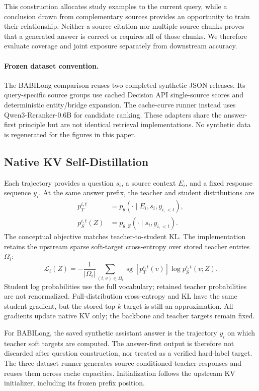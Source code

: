 This construction allocates study examples to the current query, while a conclusion drawn from complementary sources provides an opportunity to train their relationship. Neither a source citation nor multiple source chunks proves that a generated answer is correct or requires all of those chunks. We therefore evaluate coverage and joint exposure separately from downstream accuracy.

\paragraph{Frozen dataset convention.}
The BABILong comparison reuses two completed synthetic JSON releases. Its query-specific source groups use cached Decision API single-source scores and deterministic entity/bridge expansion. The cache-curve runner instead uses Qwen3-Reranker-0.6B for candidate ranking. These adapters share the answer-first principle but are not identical retrieval implementations. No synthetic data is regenerated for the figures in this paper.

\subsection{Native KV Self-Distillation}

Each trajectory provides a question $s_i$, a source context $E_i$, and a fixed response sequence $y_i$. At the same answer prefix, the teacher and student distributions are
\begin{align}
p_T^{i,t}&=p_\theta(\cdot\mid E_i,s_i,y_{i,<t}),\\
p_S^{i,t}(Z)&=p_{\theta,Z}(\cdot\mid s_i,y_{i,<t}).
\end{align}
The conceptual objective matches teacher-to-student KL. The implementation retains the upstream sparse soft-target cross-entropy over stored teacher entries $\Omega_i$:
\begin{equation}
\mathcal L_i(Z)=-\frac{1}{|\Omega_i|}\sum_{(t,v)\in\Omega_i}
\operatorname{sg}[p_T^{i,t}(v)]\log p_S^{i,t}(v;Z).
\end{equation}
Student log probabilities use the full vocabulary; retained teacher probabilities are not renormalized. Full-distribution cross-entropy and KL have the same student gradient, but the stored top-$k$ target is still an approximation. All gradients update native KV only; the backbone and teacher targets remain fixed.

For BABILong, the saved synthetic assistant answer is the trajectory $y_i$ on which teacher soft targets are computed. The answer-first output is therefore not discarded after question construction, nor treated as a verified hard-label target. The three-dataset runner generates source-conditioned teacher responses and reuses them across cache capacities. Initialization follows the upstream KV initializer, including its frozen prefix position.

